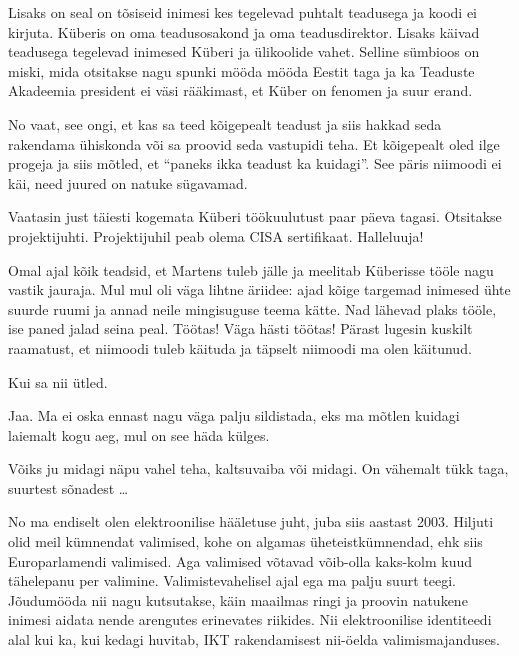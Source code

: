 Lisaks on seal on tõsiseid inimesi kes tegelevad puhtalt teadusega ja koodi ei 
kirjuta. Küberis on oma teadusosakond  ja oma teadusdirektor. Lisaks käivad 
teadusega tegelevad inimesed Küberi ja ülikoolide vahet. Selline sümbioos on 
miski, mida otsitakse nagu spunki mööda mööda Eestit taga ja ka Teaduste 
Akadeemia president ei väsi rääkimast, et Küber on fenomen ja suur erand. 


No vaat,  see ongi, et kas sa teed kõigepealt teadust ja siis hakkad seda 
rakendama ühiskonda või sa proovid seda vastupidi teha. Et kõigepealt oled ilge 
progeja ja siis mõtled, et \enquote{paneks ikka teadust ka kuidagi}. See päris 
niimoodi ei käi, need juured on natuke sügavamad.

Vaatasin just täiesti kogemata Küberi töökuulutust paar päeva tagasi. Otsitakse 
projektijuhti. Projektijuhil  peab olema CISA 
sertifikaat. 
Halleluuja!

Omal ajal  kõik teadsid, et Martens tuleb jälle ja meelitab Küberisse tööle 
nagu vastik jauraja. Mul mul oli väga lihtne äriidee:  ajad kõige targemad 
inimesed ühte suurde ruumi ja annad neile mingisuguse teema kätte. Nad lähevad 
plaks tööle, ise paned jalad seina peal. Töötas! Väga hästi töötas! Pärast 
lugesin kuskilt raamatust, et niimoodi tuleb käituda ja täpselt niimoodi ma 
olen käitunud.




Kui sa nii ütled.


Jaa. Ma ei oska ennast nagu väga palju sildistada, eks ma   mõtlen kuidagi 
laiemalt kogu aeg, mul on see häda külges.


Võiks ju midagi näpu vahel teha, kaltsuvaiba või midagi. On vähemalt tükk taga, 
suurtest sõnadest \ldots


No ma endiselt olen elektroonilise hääletuse juht, juba siis aastast 2003. 
Hiljuti olid meil  kümnendat valimised, kohe on algamas üheteistkümnendad, ehk 
siis Europarlamendi valimised. Aga valimised võtavad võib-olla 
kaks-kolm kuud tähelepanu per valimine. Valimistevahelisel ajal ega ma palju 
suurt teegi. Jõudumööda nii nagu kutsutakse, käin maailmas ringi ja proovin  
natukene  inimesi aidata nende arengutes erinevates riikides. Nii 
elektroonilise identiteedi alal kui ka, kui kedagi huvitab,  IKT rakendamisest 
nii-öelda valimismajanduses.

